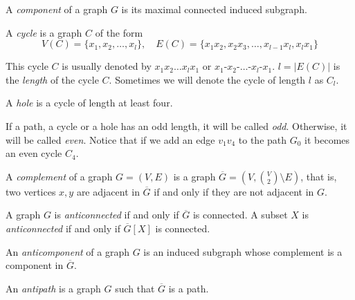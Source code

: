 \begin{defn}[component]
  A \emph{component} of a graph $G$ is its maximal connected induced subgraph.
\end{defn}


\begin{defn}[cycle]
  A \emph{cycle} is a graph $C$ of the form
  \[ V(C) = \{x_1, x_2, \ldots, x_l\},\quad E(C) = \{x_1x_2, x_2x_3, \ldots, x_{l-1}x_l, x_lx_1\} \]
\end{defn}

This cycle $C$ is usually denoted by $x_1x_2\ldots x_lx_1$ or $x_1$-$x_2$-$\ldots$-$x_l$-$x_1$. $l = |E(C)|$ is the \emph{length} of the cycle $C$. Sometimes we will denote the cycle of length $l$ as $C_l$.


\begin{defn}[hole]
  A \emph{hole} is a cycle of length at least four.
\end{defn}

If a path, a cycle or a hole has an odd length, it will be called \emph{odd}. Otherwise, it will be called \emph{even}. Notice that if we add an edge $v_1v_4$ to the path $G_0$ it becomes an even cycle $C_4$.
\begin{defn}[complement]
  A \emph{complement} of a graph $G = (V, E)$ is a graph $\overline{G} = (V, {V \choose 2} \setminus E)$, that is, two vertices $x, y$ are adjacent in $\overline{G}$ if and only if they are not adjacent in $G$.
\end{defn}


\begin{defn}
  A graph $G$ is \emph{anticonnected} if and only if $\overline{G}$ is connected.
  A subset $X$ is \emph{anticonnected} if and only if $\overline{G}[X]$ is connected.
\end{defn}

\begin{defn}[anticomponent]
  An \emph{anticomponent} of a graph $G$ is an induced subgraph whose complement is a component in $\overline{G}$.
\end{defn}

\begin{defn}[antipath]
  An \emph{antipath} is a graph $G$ such that $\overline{G}$ is a path.
\end{defn}

